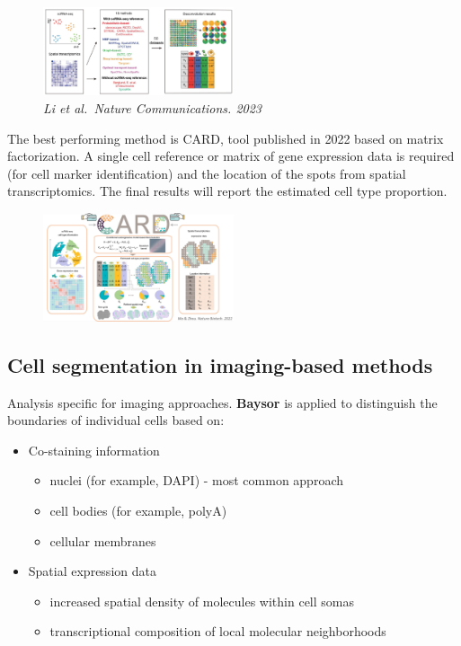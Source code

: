 \begin{figure}
\centering
\includegraphics[width=0.5\textwidth]{images/Screenshot_8.png}
\caption{\emph{Li et al.~Nature Communications. 2023}}
\end{figure}


The best performing method is CARD, tool published in 2022 based on
matrix factorization. A single cell reference or matrix of gene
expression data is required (for cell marker identification) and the
location of the spots from spatial transcriptomics. The final results
will report the estimated cell type proportion.

\begin{figure}
\centering
\includegraphics[width=0.5\textwidth]{images/Screenshot_9.png}
\caption{}
\end{figure}

\hypertarget{cell-segmentation-in-imaging-based-methods}{%
\subsection{Cell segmentation in imaging-based
methods}\label{cell-segmentation-in-imaging-based-methods}}

Analysis specific for imaging approaches. \textbf{Baysor} is applied to
distinguish the boundaries of individual cells based on:

\begin{itemize}
\tightlist
\item
  Co-staining information

  \begin{itemize}
  \tightlist
  \item
    nuclei (for example, DAPI) - most common approach
  \item
    cell bodies (for example, polyA)
  \item
    cellular membranes
  \end{itemize}
\item
  Spatial expression data

  \begin{itemize}
  \tightlist
  \item
    increased spatial density of molecules within cell somas
  \item
    transcriptional composition of local molecular neighborhoods
  \end{itemize}
\end{itemize}

